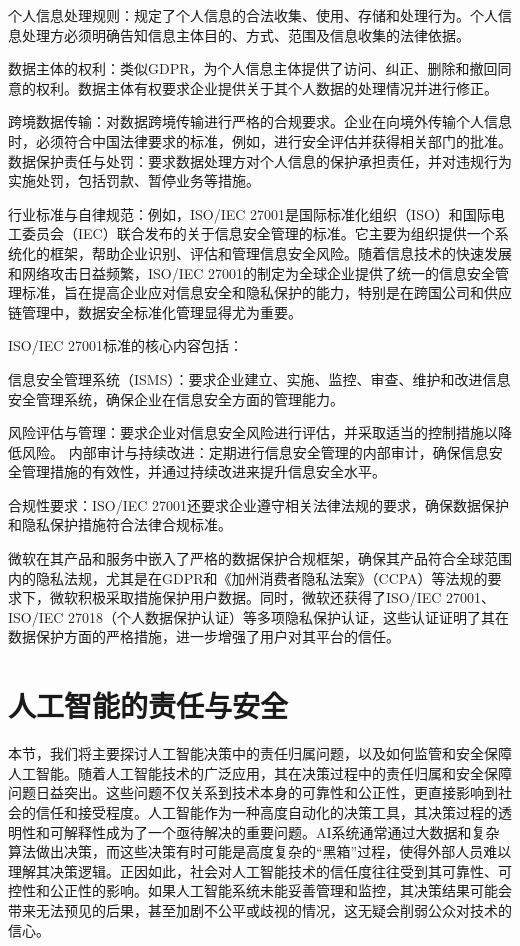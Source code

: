 个人信息处理规则：规定了个人信息的合法收集、使用、存储和处理行为。个人信息处理方必须明确告知信息主体目的、方式、范围及信息收集的法律依据。

数据主体的权利：类似GDPR，为个人信息主体提供了访问、纠正、删除和撤回同意的权利。数据主体有权要求企业提供关于其个人数据的处理情况并进行修正。

跨境数据传输：对数据跨境传输进行严格的合规要求。企业在向境外传输个人信息时，必须符合中国法律要求的标准，例如，进行安全评估并获得相关部门的批准。
数据保护责任与处罚：要求数据处理方对个人信息的保护承担责任，并对违规行为实施处罚，包括罚款、暂停业务等措施。

行业标准与自律规范：例如，ISO/IEC 27001是国际标准化组织（ISO）和国际电工委员会（IEC）联合发布的关于信息安全管理的标准。它主要为组织提供一个系统化的框架，帮助企业识别、评估和管理信息安全风险。随着信息技术的快速发展和网络攻击日益频繁，ISO/IEC 27001的制定为全球企业提供了统一的信息安全管理标准，旨在提高企业应对信息安全和隐私保护的能力，特别是在跨国公司和供应链管理中，数据安全标准化管理显得尤为重要。

ISO/IEC 27001标准的核心内容包括：

信息安全管理系统（ISMS）：要求企业建立、实施、监控、审查、维护和改进信息安全管理系统，确保企业在信息安全方面的管理能力。

风险评估与管理：要求企业对信息安全风险进行评估，并采取适当的控制措施以降低风险。
内部审计与持续改进：定期进行信息安全管理的内部审计，确保信息安全管理措施的有效性，并通过持续改进来提升信息安全水平。

合规性要求：ISO/IEC 27001还要求企业遵守相关法律法规的要求，确保数据保护和隐私保护措施符合法律合规标准。

微软在其产品和服务中嵌入了严格的数据保护合规框架，确保其产品符合全球范围内的隐私法规，尤其是在GDPR和《加州消费者隐私法案》（CCPA）等法规的要求下，微软积极采取措施保护用户数据。同时，微软还获得了ISO/IEC 27001、ISO/IEC 27018（个人数据保护认证）等多项隐私保护认证，这些认证证明了其在数据保护方面的严格措施，进一步增强了用户对其平台的信任。

\section{人工智能的责任与安全}
本节，我们将主要探讨人工智能决策中的责任归属问题，以及如何监管和安全保障人工智能。随着人工智能技术的广泛应用，其在决策过程中的责任归属和安全保障问题日益突出。这些问题不仅关系到技术本身的可靠性和公正性，更直接影响到社会的信任和接受程度。人工智能作为一种高度自动化的决策工具，其决策过程的透明性和可解释性成为了一个亟待解决的重要问题。AI系统通常通过大数据和复杂算法做出决策，而这些决策有时可能是高度复杂的“黑箱”过程，使得外部人员难以理解其决策逻辑。正因如此，社会对人工智能技术的信任度往往受到其可靠性、可控性和公正性的影响。如果人工智能系统未能妥善管理和监控，其决策结果可能会带来无法预见的后果，甚至加剧不公平或歧视的情况，这无疑会削弱公众对技术的信心。

